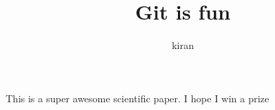 \documentclass[10pt]{article}
\author{kiran}
\title{Git is fun}
\begin{document}
     \maketitle
               
          This is a super awesome scientific paper.
          I hope I win a prize
\end{document}
